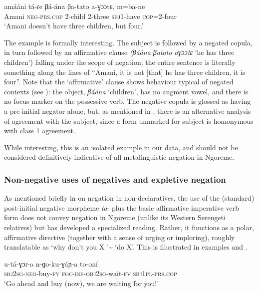 \documentclass[output=paper,colorlinks,citecolor=brown,draftmode]{langscibook}
\begin{document}
\ea\label{ex:ngo:87} 
    \gll amááni tá{}-ɾe βá{}-ána βa-tato a-ɣɔɔtɛ, m=ba-ne\\ 
        Amani \textsc{neg-prs.cop} 2-child 2-three \textsc{sbj}1-have \textsc{cop=}2-four\\
    \glt ‘Amani doesn’t have three children, but four.’
\z 

The example is formally interesting. The subject is followed by a negated copula, in turn followed by an affirmative clause \textit{(βáána βatato aɣɔɔtɛ} ‘he has three children’) falling under the scope of negation; the entire sentence is literally something along the lines of “Amani, it is not [that] he has three children, it is four”. Note that the ‘affirmative’ clause shows behaviour typical of negated contexts (see ): the object, \textit{βáána} ‘children’, has no augment vowel, and there is no focus marker on the possessive verb. The negative copula is glossed as having a pre-initial negator alone, but, as mentioned in , there is an alternative analysis of agreement with the subject, since a form unmarked for subject is homonymous with class 1 agreement.

While interesting, this is an isolated example in our data, and should not be considered definitively indicative of all metalinguistic negation in Ngoreme. 

\subsubsection{Non-negative uses of negatives and expletive negation}\label{sec:ngo:4.7}

As mentioned briefly in  on negation in non-declaratives, the use of the (standard) post-initial negative morpheme \textit{ta}{}- plus the basic affirmative imperative verb form does not convey negation in Ngoreme (unlike its Western Serengeti relatives) but has developed a specialized reading. Rather, it functions as a polar, affirmative directive (together with a sense of urging or imploring), roughly translatable as ‘why don’t you X ’{\textasciitilde} ‘do X’. This is illustrated in examples  and .

\ea\label{ex:ngo:88} 
     \gll u-tá{}-ɣɔɾ{}-a n-ɡo-ku-ɣáɲ-a to{}-oní  \\ 
        \textsc{sbj}2\textsc{sg}{}-\textsc{neg}{}-buy-\textsc{fv} \textsc{foc}{}-\textsc{inf}{}-\textsc{obj}2\textsc{sg}{}-wait-\textsc{fv} \textsc{sbj}1\textsc{pl}{}-\textsc{prs.cop}\\
    \glt ‘Go ahead and buy (now), we are waiting for you!’ 
\z 
\end{document}
